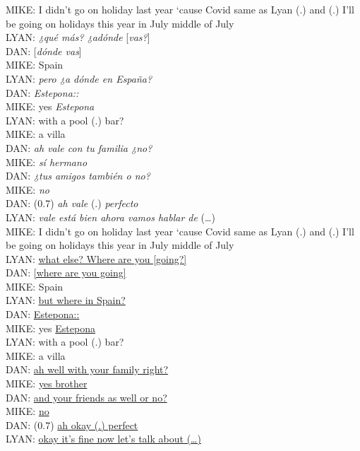 \documentclass[output=paper]{langscibook}
\begin{document}
\begin{exe}\ex\label{RG:ex10}
MIKE:  I didn’t go on holiday last year ‘cause Covid same as Lyan (.) and (.) I’ll be going on holidays this year in July middle of July\\
LYAN: \textit{¿qué más? ¿adónde }[\textit{vas?}]\\
DAN: [\textit{dónde vas}]\\
MIKE: Spain\\
LYAN:\textit{ pero ¿a dónde en España?}\\
DAN: \textit{Estepona::}\\
MIKE: yes \textit{Estepona}\\
LYAN: with a pool (.) bar?\\
MIKE: a villa\\
DAN: \textit{ah vale con tu familia ¿no?}\\
MIKE: \textit{sí hermano}\\
DAN: \textit{¿tus amigos también o no?}\\
MIKE: \textit{no}\\
DAN: (0.7) \textit{ah vale} (.) \textit{perfecto}\\
LYAN: \textit{vale está bien ahora vamos hablar de} (…)\\

MIKE: I didn’t go on holiday last year ‘cause Covid same as Lyan (.) and (.) I’ll be going on holidays this year in July middle of July\\
LYAN: \ul{what else? Where are you [going?]}\\
DAN: \ul{[where are you going]}\\
MIKE: Spain\\
LYAN: \ul{but where in Spain?}\\
DAN: \ul{Estepona::}\\
MIKE: yes \ul{Estepona}\\
LYAN: with a pool (.) bar?\\
MIKE: a villa\\
DAN: \ul{ah well with your family right?}\\
MIKE: \ul{yes brother}\\
DAN: \ul{and your friends as well or no?}\\
MIKE: \ul{no}\\
DAN: (0.7) \ul{ah okay (.) perfect}\\
LYAN: \ul{okay it’s fine now let’s talk about (…)}
\end{exe}
\end{document}
